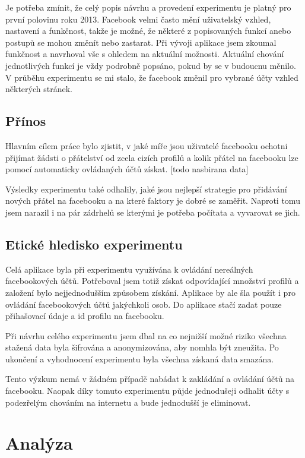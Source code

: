 \documentclass[thesis=M,czech]{FITthesis}[2013/05/10]
\begin{document}
Je potřeba zmínit, že celý popis návrhu a provedení experimentu je platný pro první polovinu roku 2013. Facebook velmi často mění uživatelský vzhled, nastavení a funkčnost, takže je možné, že některé z popisovaných funkcí anebo postupů se mohou změnít nebo zastarat. Při vývoji aplikace jsem zkoumal funkčnost a navrhoval vše s ohledem na aktuální možnosti. Aktuální chování jednotlivých funkcí je vždy podrobně popsáno, pokud by se v budoucnu měnilo. V průběhu experimentu se mi stalo, že facebook změnil pro vybrané účty vzhled některých stránek. 

\section{Přínos}

Hlavním cílem práce bylo zjistit, v jaké míře jsou uživatelé facebooku ochotni přijímat žádsti o přátelství od zcela cizích profilů a kolik přátel na facebooku lze pomocí automaticky ovládaných účtů získat. [todo nasbirana data]

Výsledky experimentu také odhalily, jaké jsou nejlepší strategie pro přidávání nových přátel na facebooku a na které faktory je dobré se zaměřit. Naproti tomu jsem narazil i na pár zádrhelů se kterými je potřeba počítata a vyvarovat se jich.

\section{Etické hledisko experimentu}

Celá aplikace byla při experimentu využívána k ovládání nereálných facebookových účtů. Potřeboval jsem totiž získat odpovídající množství profilů a založení bylo nejjednodušším způsobem získání. Aplikace by ale šla použít i pro ovládání facebookových účtů jakýchkoli osob. Do aplikace stačí zadat pouze přihašovací údaje a id profilu na facebooku.

Při návrhu celého experimentu jsem dbal na co nejnižší možné riziko všechna stažená data byla šifrována a anonymizována, aby nomhla být zneužita. Po ukončení a vyhodnocení experimentu byla všechna získaná data smazána. 

Tento výzkum nemá v žádném případě nabádat k zakládání a ovládání účtů na facebooku. Naopak díky tomuto experimentu půjde jednodušeji odhalit účty s podezřelým chováním na internetu a bude jednodušší je eliminovat.






\chapter{Analýza}
\end{document}
